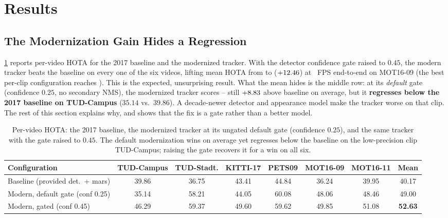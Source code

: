 \section{Results}
\label{sec:results}

\subsection{The Modernization Gain Hides a Regression}
\label{sec:headline}

\cref{tab:fullpipeline} reports per-video HOTA for the 2017 baseline and the modernized tracker.
With the detector confidence gate raised to $0.45$, the modern tracker beats the baseline on every
one of the six videos, lifting mean HOTA from \baselineHOTA{} to \modernHOTA{} ($+12.46$) at
\fpsRealtime{}~FPS end-to-end on MOT16-09 (the best per-clip configuration reaches \modernBestHOTA{}).
This is the expected,
unsurprising result. What the mean hides is the middle row: at its \emph{default} gate (confidence
$0.25$, no secondary NMS), the modernized tracker scores \modernDefaultHOTA{} -- still
$+8.83$ above baseline on average, but it \textbf{regresses below the 2017 baseline on
TUD-Campus} ($35.14$ vs.\ $39.86$). A decade-newer detector and appearance model make the tracker
worse on that clip. The rest of this section explains why, and shows that the fix is a gate rather
than a better model.

\begin{table}[t]
\centering
\caption{Per-video HOTA: the 2017 baseline, the modernized tracker at its ungated default gate
(confidence $0.25$), and the same tracker with the gate raised to $0.45$. The default modernization
wins on average yet regresses below the baseline on the low-precision clip TUD-Campus; raising the
gate recovers it for a win on all six.}
\label{tab:fullpipeline}
\small
\begin{tabular}{lccccccc}
\toprule
\textbf{Configuration} & TUD-Campus & TUD-Stadt. & KITTI-17 & PETS09 & MOT16-09 & MOT16-11 & \textbf{Mean} \\
\midrule
Baseline (provided det.\ + mars)   & 39.86 & 36.75 & 43.41 & 44.84 & 36.24 & 39.95 & 40.17 \\
Modern, default gate (conf 0.25)   & 35.14 & 58.21 & 44.05 & 60.08 & 48.06 & 48.46 & 49.00 \\
Modern, gated (conf 0.45)          & 46.29 & 59.37 & 49.60 & 59.62 & 49.85 & 51.08 & \textbf{52.63} \\
\bottomrule
\end{tabular}
\end{table}

